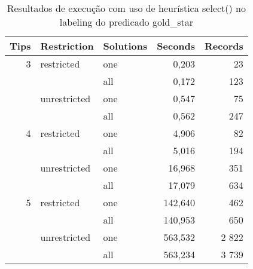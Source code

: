 \begin{table}[htbp]
  \centering
  \caption{Resultados de execução com uso de heurística select() no labeling do predicado gold\_star}
    \begin{tabular}{rrlrr}
    \hline
    \multicolumn{1}{l}{Tips} & \multicolumn{1}{l}{Restriction} & Solutions & \multicolumn{1}{l}{Seconds} & \multicolumn{1}{l}{Records} \\ \hline\hline
    3     & \multicolumn{1}{l}{restricted} & one   & 0,203 & 23 \\
          &       & all   & 0,172 & 123 \\
          & \multicolumn{1}{l}{unrestricted} & one   & 0,547 & 75 \\
          &       & all   & 0,562 & 247 \\
    4     & \multicolumn{1}{l}{restricted} & one   & 4,906 & 82 \\
          &       & all   & 5,016 & 194 \\
          & \multicolumn{1}{l}{unrestricted} & one   & 16,968 & 351 \\
          &       & all   & 17,079 & 634 \\
    5     & \multicolumn{1}{l}{restricted} & one   & 142,640 & 462 \\
          &       & all   & 140,953 & 650 \\
          & \multicolumn{1}{l}{unrestricted} & one   & 563,532 & 2 822 \\
          &       & all   & 563,234 & 3 739 \\ \hline
    \end{tabular}%
  \label{tab:custom_heuristics}%
\end{table}%
